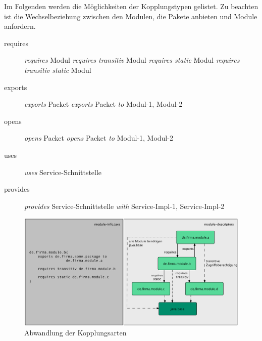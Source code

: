     Im Folgenden werden die Möglichkeiten der Kopplungstypen gelistet. Zu beachten ist die Wechselbeziehung zwischen den Modulen, die Pakete anbieten und Module anfordern. 

    \begin{description}
      \item[requires]\hfill
      \newline \textit{requires} Modul
      \newline \textit{requires transitiv} Modul
      \newline \textit{requires static} Modul
      \newline \textit{requires transitiv static} Modul
      \item[exports]\hfill
      \newline \textit{exports} Packet
      \newline \textit{exports} Packet \textit{to} Modul-1, Modul-2
      \item[opens]\hfill
      \newline \textit{opens} Packet
      \newline \textit{opens} Packet \textit{to} Modul-1, Modul-2
      \item [uses]\hfill
      \newline \textit{uses} Service-Schnittstelle 
      \item[provides]\hfill
        \newline \textit{provides} Service-Schnittstelle \textit{with} Service-Impl-1, Service-Impl-2
  \end{description}

  \begin{figure}[h!]
      \centering
      \includegraphics[width=\textwidth]{material/images/transitiv3.png}
      \caption{Abwandlung der Kopplungsarten}
      \label{fig:abw-kopl}
  \end{figure}
\newpage

